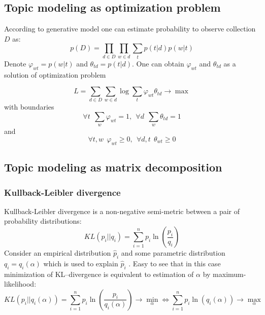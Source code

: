     \subsection{Topic modeling as optimization problem}
	According to generative model one can estimate probability to observe collection $D$ as:
	\begin{equation} p(D) = \prod_{d \in D} \prod_{w \in d} \sum_{t} p(t|d) p(w|t) \end{equation}
	Denote $\varphi_{wt} = p(w|t)$ and $\theta_{td} = p(t|d)$. One can obtain $\varphi_{wt}$
	and $\theta_{td}$ as a solution of optimization problem

	\begin{equation} \label{optimization} L = \sum_{d \in D} \sum_{w \in d} \log \sum_{t} \varphi_{wt} \theta_{td}  \to \max \end{equation}
	    with boundaries
	\begin{equation} \forall t \ \ \sum_{w} \varphi_{wt} = 1, \ \ \forall d \ \ \sum_{w} \theta_{td} = 1 \end{equation}
	and
	\begin{equation} \forall t, w \ \  \varphi_{wt}  \geq 0, \ \ \forall d, t \ \ \theta_{wt}  \geq 0 \end{equation}

    \subsection{Topic modeling as matrix decomposition} \label{matrixDecomposition}

	\subsubsection{Kullback-Leibler divergence}
	    Kullback-Leibler divergence is a non-negative semi-metric between a pair of probability distributions:
	    \begin{equation} KL(p_i||q_i) = \sum_{i=1}^n p_i \ln\left(\frac{p_i}{q_i}\right)  \end{equation}
	    Consider an empirical distribution $\hat{p}_i$ and some parametric distribution $q_i = q_i(\alpha)$ which is used to explain $\hat{p}_i$ .
	    Easy to see that in this case minimization of KL\---divergence is equivalent to estimation of $\alpha$ by maximum-likelihood:
	    \begin{equation} KL(p_i||q_i(\alpha)) = \sum_{i=1}^n p_i \ln\left(\frac{p_i}{q_i(\alpha)}\right) \to \min_{\alpha}
	    \Leftrightarrow \sum_{i=1}^n p_i \ln(q_i(\alpha)) \to \max_{\alpha} \end{equation}

